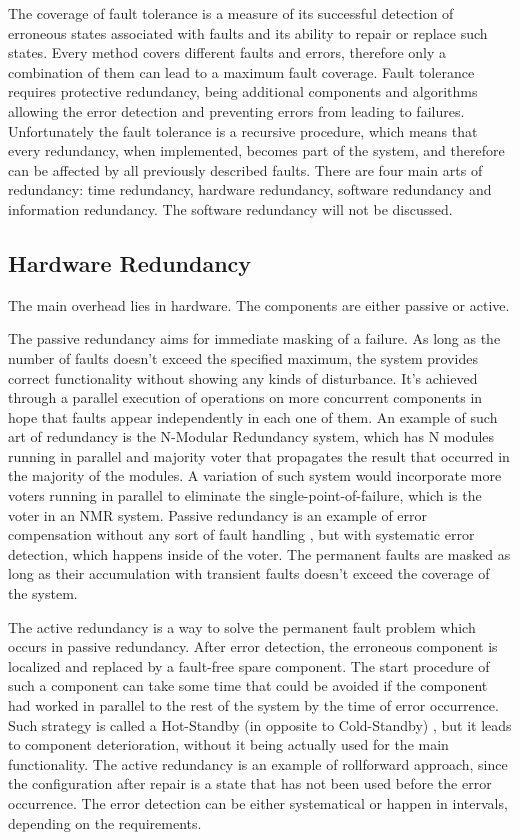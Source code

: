 The coverage of fault tolerance is a measure of its successful detection of erroneous states associated with faults and its ability to repair or replace such states. Every method covers different faults and errors, therefore only a combination of them can lead to a maximum fault coverage.
Fault tolerance requires protective redundancy, being additional components and algorithms allowing the error detection and preventing errors from leading to failures. Unfortunately the fault tolerance is a recursive procedure, which means that every redundancy, when implemented, becomes part of the system, and therefore can be affected by all previously described faults.
There are four main arts of redundancy: time redundancy, hardware redundancy, software redundancy and information redundancy. The software redundancy will not be discussed.
\subsection{Hardware Redundancy} \label{ssec:HWred}
The main overhead lies in hardware. The components are either passive or active. 

The passive redundancy aims for immediate masking of a failure. As long as the number of faults doesn't exceed the specified maximum, the system provides correct functionality without showing any kinds of disturbance. It's achieved through a parallel execution of operations on more concurrent components in hope that faults appear independently in each one of them. An example of such art of redundancy is the N-Modular Redundancy system, which has N modules running in parallel and majority voter that propagates the result that occurred in the majority of the modules. A variation of such system would incorporate more voters running in parallel to eliminate the single-point-of-failure, which is the voter in an NMR system. Passive redundancy is an example of error compensation without any sort of fault handling , but with systematic error detection, which happens inside of the voter. The permanent faults are masked as long as their accumulation with transient faults doesn't exceed the coverage of the system.

The active redundancy is a way to solve the permanent fault problem which occurs in passive redundancy. After error detection, the erroneous component is localized and replaced by a fault-free spare component. The start procedure of such a component can take some time that could be avoided if the component had worked in parallel to the rest of the system by the time of error occurrence. Such strategy is called a Hot-Standby (in opposite to Cold-Standby) , but it leads to component deterioration, without it being actually used for the main functionality. The active redundancy is an example of rollforward approach, since the configuration after repair is a state that has not been used before the error occurrence. The error detection can be either systematical or happen in intervals, depending on the requirements.

